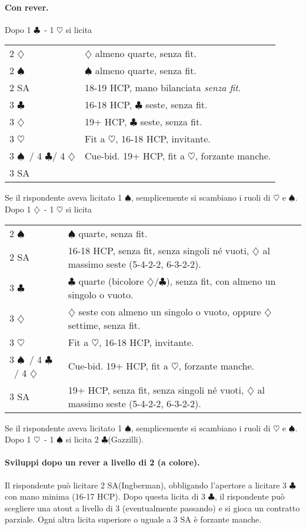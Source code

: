 \documentclass[a4paper,10pt]{article}
\renewcommand{\c}{$\clubsuit$\xspace}
\renewcommand{\d}{$\diamondsuit$\xspace}
\newcommand{\h}{$\heartsuit$\xspace}
\newcommand{\s}{$\spadesuit$\xspace}
\newcommand{\sa}{SA\xspace}
\newcommand{\smallspace}{\vskip0.3cm}
\newenvironment{twocol}
  {\smallspace\noindent\begin{tabular}{l p{0.78\textwidth}}}
  {\end{tabular}\smallspace}
\begin{document}
\paragraph{Con rever.} Dopo 1 \c\ - 1 \h si licita
\begin{twocol}
	2 \d & \d almeno quarte, senza fit.\\
	2 \s & \s almeno quarte, senza fit.\\
	2 \sa & 18-19 HCP, mano bilanciata \emph{senza fit}.\\
	3 \c & 16-18 HCP, \c seste, senza fit.\\
	3 \d & 19+ HCP, \c seste, senza fit.\\
	3 \h & Fit a \h, 16-18 HCP, invitante.\\
	3 \s\ / 4 \c / 4 \d & Cue-bid. 19+ HCP, fit a \h, forzante manche.\\
	3 \sa & 
\end{twocol}

\noindent Se il rispondente aveva licitato 1 \s, semplicemente si scambiano i ruoli di \h e \s.
\smallspace
\noindent Dopo 1 \d\ - 1 \h si licita
\begin{twocol}
	2 \s & \s quarte, senza fit.\\
	2 \sa & 16-18 HCP, senza fit, senza singoli né vuoti, \d al massimo seste (5-4-2-2, 6-3-2-2).\\
	3 \c & \c quarte (bicolore \d/\c), senza fit, con almeno un singolo o vuoto.\\
	3 \d & \d seste con almeno un singolo o vuoto, oppure \d settime, senza fit.\\
	3 \h & Fit a \h, 16-18 HCP, invitante.\\
	3 \s\ / 4 \c\ / 4 \d & Cue-bid. 19+ HCP, fit a \h, forzante manche.\\
	3 \sa & 19+ HCP, senza fit, senza singoli né vuoti, \d al massimo seste (5-4-2-2, 6-3-2-2).
\end{twocol}

\noindent Se il rispondente aveva licitato 1 \s, semplicemente si scambiano i ruoli di \h e \s.
\smallspace
\noindent Dopo 1 \h\ - 1 \s si licita 2 \c (Gazzilli).

\paragraph{Sviluppi dopo un rever a livello di 2 (a colore).} Il rispondente può licitare 2 \sa (Ingberman), obbligando l'apertore a licitare 3 \c con mano minima (16-17 HCP). Dopo questa licita di 3 \c, il rispondente può scegliere una atout a livello di 3 (eventualmente passando) e si gioca un contratto parziale. Ogni altra licita superiore o uguale a 3 \sa è forzante manche.
\end{document}
